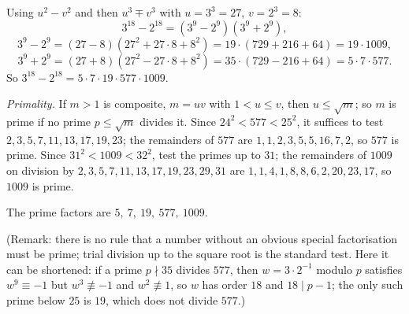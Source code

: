 Using $u^2-v^2$ and then $u^3\mp v^3$ with $u=3^3=27$, $v=2^3=8$:
\[3^{18}-2^{18}=\left(3^9-2^9\right)\left(3^9+2^9\right),\]
\[3^9-2^9=(27-8)\left(27^2+27\cdot8+8^2\right)=19\cdot(729+216+64)=19\cdot1009,\]
\[3^9+2^9=(27+8)\left(27^2-27\cdot8+8^2\right)=35\cdot(729-216+64)=5\cdot7\cdot577.\]
So $3^{18}-2^{18}=5\cdot7\cdot19\cdot577\cdot1009$.

\emph{Primality.} If $m>1$ is composite, $m=uv$ with $1<u\le v$, then $u\le\sqrt m$; so $m$ is prime if no prime $p\le\sqrt m$ divides it. Since $24^2<577<25^2$, it suffices to test $2,3,5,7,11,13,17,19,23$; the remainders of $577$ are $1,1,2,3,5,5,16,7,2$, so $577$ is prime. Since $31^2<1009<32^2$, test the primes up to $31$; the remainders of $1009$ on division by $2,3,5,7,11,13,17,19,23,29,31$ are $1,1,4,1,8,8,6,2,20,23,17$, so $1009$ is prime.

The prime factors are $\boxed{5,\ 7,\ 19,\ 577,\ 1009}$.

(Remark: there is no rule that a number without an obvious special factorisation must be prime; trial division up to the square root is the standard test. Here it can be shortened: if a prime $p\nmid35$ divides $577$, then $w=3\cdot2^{-1}$ modulo $p$ satisfies $w^9\equiv-1$ but $w^3\not\equiv-1$ and $w^2\not\equiv1$, so $w$ has order $18$ and $18\mid p-1$; the only such prime below $25$ is $19$, which does not divide $577$.)
